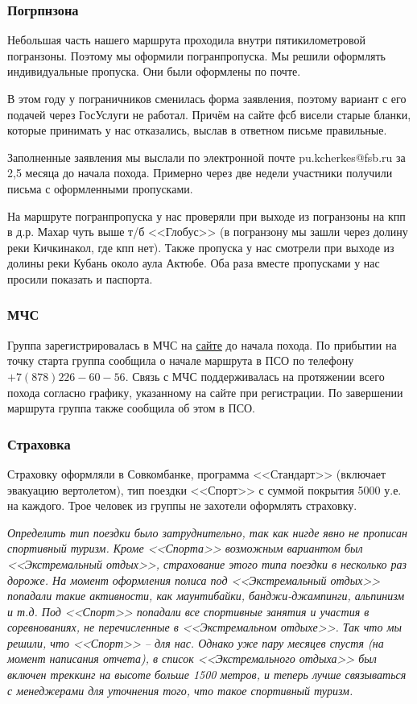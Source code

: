 		\subsubsection{Погрпнзона}
			Небольшая часть нашего маршрута проходила внутри пятикилометровой погранзоны. Поэтому мы оформили
			погранпропуска. Мы решили оформлять индивидуальные пропуска. Они были оформлены по почте. 
			
			В этом году у пограничников сменилась форма заявления, поэтому вариант с его подачей через ГосУслуги
			не работал. Причём на сайте фсб висели старые бланки, которые принимать у нас отказались, выслав в
			ответном письме правильные.
			
			Заполненные заявления мы выслали по электронной почте pu.kcherkes@fsb.ru за 2,5 месяца до начала похода.
			Примерно через две недели участники получили письма с оформленными пропусками. 
			
			На маршруте погранпропуска у нас проверяли при выходе из погранзоны на кпп в д.р. Махар чуть выше
			т/б <<Глобус>> (в погранзону мы зашли через долину реки Кичкинакол, где кпп нет). Также пропуска
			у нас смотрели при выходе из долины реки Кубань около аула Актюбе. Оба раза вместе  пропусками у
			нас просили показать и паспорта.


		\subsubsection{МЧС}
			Группа зарегистрировалась в МЧС на \href{https://forms.mchs.gov.ru/registration_tourist_groups}{сайте}
			до начала похода. По прибытии на точку старта группа сообщила о начале маршрута в ПСО по телефону
			$+7 (878) 226-60-56$. Связь с МЧС поддерживалась на протяжении всего похода согласно графику, указанному
			на сайте при регистрации. По завершении маршрута группа также сообщила об этом в ПСО.

		\subsubsection{Страховка}
			Страховку оформляли в Совкомбанке, программа <<Стандарт>> (включает эвакуацию вертолетом), тип поездки
			<<Спорт>> с суммой покрытия 5000 у.е. на каждого. Трое человек из группы не захотели оформлять страховку.
 
			\textit{Определить тип поездки было затруднительно, так как нигде явно не прописан спортивный туризм.
			Кроме <<Спорта>> возможным вариантом был <<Экстремальный отдых>>, страхование этого типа поездки в
			несколько раз дороже. На момент оформления полиса под <<Экстремальный отдых>> попадали такие активности,
			как маунтибайки, банджи-джампинги, альпинизм и т.д. Под <<Спорт>> попадали все спортивные занятия и
			участия в соревнованиях, не перечисленные в <<Экстремальном отдыхе>>. Так что мы решили, что
			<<Спорт>> -- для нас. Однако уже пару месяцев спустя (на момент написания отчета), в список
			<<Экстремального отдыха>> был включен треккинг на высоте больше 1500 метров, и теперь лучше связываться
			с менеджерами для уточнения того, что такое спортивный туризм.}

